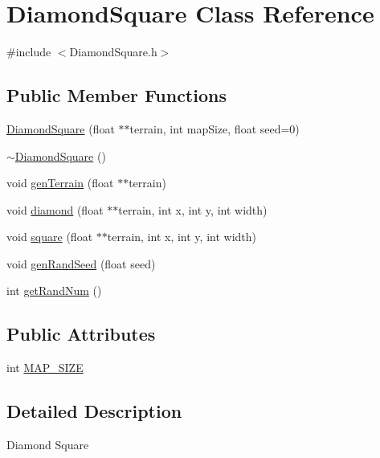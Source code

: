 \hypertarget{class_diamond_square}{}\section{Diamond\+Square Class Reference}
\label{class_diamond_square}


{\ttfamily \#include $<$Diamond\+Square.\+h$>$}

\subsection*{Public Member Functions}
\begin{DoxyCompactItemize}
\item 
\hyperlink{class_diamond_square_a2b33c5a6b2828341547a631ad35a8b96}{Diamond\+Square} (float $\ast$$\ast$terrain, int map\+Size, float seed=0)
\item 
\hyperlink{class_diamond_square_afd8e0121742223c16f003f080ccf25f4}{$\sim$\+Diamond\+Square} ()
\item 
void \hyperlink{class_diamond_square_a88a0bb010425e5c84fc0d3f308c3d33b}{gen\+Terrain} (float $\ast$$\ast$terrain)
\item 
void \hyperlink{class_diamond_square_a631c82d30a581795aa587b6e80294341}{diamond} (float $\ast$$\ast$terrain, int x, int y, int width)
\item 
void \hyperlink{class_diamond_square_afc5f9469fd38c7d8db74bdd024de9b3f}{square} (float $\ast$$\ast$terrain, int x, int y, int width)
\item 
void \hyperlink{class_diamond_square_a65b8ebe5308518b347e12caa52c53237}{gen\+Rand\+Seed} (float seed)
\item 
int \hyperlink{class_diamond_square_a990af271a13b48e646742036bec3dc8c}{get\+Rand\+Num} ()
\end{DoxyCompactItemize}
\subsection*{Public Attributes}
\begin{DoxyCompactItemize}
\item 
int \hyperlink{class_diamond_square_a051e1e1f11a4202cdbb048ab84c4b4d7}{M\+A\+P\+\_\+\+S\+I\+Z\+E}
\end{DoxyCompactItemize}


\subsection{Detailed Description}
Diamond Square

